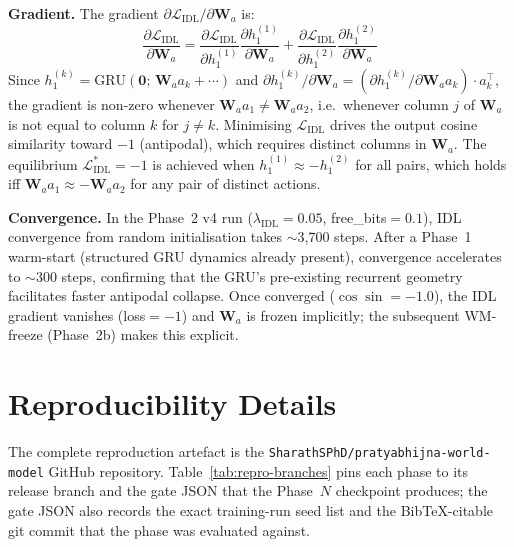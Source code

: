 \documentclass[journal,onecolumn,11pt]{IEEEtran}
\begin{document}
\textbf{Gradient.}
The gradient $\partial \mathcal{L}_{\text{IDL}} / \partial \mathbf{W}_a$ is:
\begin{equation}
  \frac{\partial \mathcal{L}_{\text{IDL}}}{\partial \mathbf{W}_a} =
  \frac{\partial \mathcal{L}_{\text{IDL}}}{\partial h_1^{(1)}}
  \frac{\partial h_1^{(1)}}{\partial \mathbf{W}_a} +
  \frac{\partial \mathcal{L}_{\text{IDL}}}{\partial h_1^{(2)}}
  \frac{\partial h_1^{(2)}}{\partial \mathbf{W}_a}
\end{equation}
Since $h_1^{(k)} = \text{GRU}(\mathbf{0};\, \mathbf{W}_a a_k + \cdots)$
and $\partial h_1^{(k)} / \partial \mathbf{W}_a = (\partial h_1^{(k)} / \partial \mathbf{W}_a a_k) \cdot a_k^\top$,
the gradient is non-zero whenever $\mathbf{W}_a a_1 \neq \mathbf{W}_a a_2$,
i.e.\ whenever column $j$ of $\mathbf{W}_a$ is not equal to column $k$ for $j \neq k$.
Minimising $\mathcal{L}_{\text{IDL}}$ drives the output cosine similarity
toward $-1$ (antipodal), which requires distinct columns in $\mathbf{W}_a$.
The equilibrium $\mathcal{L}_{\text{IDL}}^* = -1$ is achieved when
$h_1^{(1)} \approx -h_1^{(2)}$ for all pairs, which holds iff $\mathbf{W}_a a_1 \approx -\mathbf{W}_a a_2$
for any pair of distinct actions.

\textbf{Convergence.}
In the Phase~2 v4 run ($\lambda_{\text{IDL}}{=}0.05$, free\_bits$=0.1$),
IDL convergence from random initialisation takes $\sim$3{,}700 steps.
After a Phase~1 warm-start (structured GRU dynamics already present),
convergence accelerates to $\sim$300 steps, confirming that the GRU's
pre-existing recurrent geometry facilitates faster antipodal collapse.
Once converged ($\cos\!\sin = -1.0$), the IDL gradient vanishes (loss$=-1$)
and $\mathbf{W}_a$ is frozen implicitly; the subsequent WM-freeze (Phase~2b)
makes this explicit.

\section{Reproducibility Details}\label{app:reproducibility}

The complete reproduction artefact is the
\texttt{SharathSPhD/pratyabhijna-world-model} GitHub repository.
Table~\ref{tab:repro-branches} pins each phase to its release branch and
the gate JSON that the Phase~$N$ checkpoint produces; the gate JSON also
records the exact training-run seed list and the BibTeX-citable git commit
that the phase was evaluated against.
\end{document}
